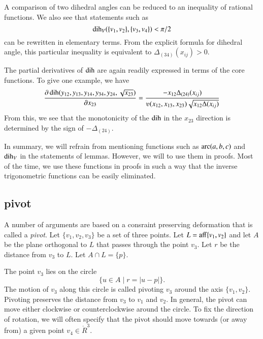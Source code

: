 A comparison of two dihedral angles can be reduced to an inequality
of rational functions. We also see that statements such as
  $$
  \operatorname{dih}_V(\{v_1,v_2\},\{v_3,v_4\}) < \pi/2
  $$
can be rewritten in elementary terms.  From the explicit formula
for dihedral angle, this particular inequality
is equivalent to $\Delta_{(34)}(x_{ij}) > 0$.

The partial derivatives of $\operatorname{dih}$ are again readily expressed in
terms of the core functions.
To give one example, we have
  $$
  \frac{\partial\dih(y_{12},y_{13},y_{14},y_{34},y_{24},\sqrt{x_{23}})}
  {\partial x_{23}} = 
  \frac{ -x_{12} \Delta_{(24)}(x_{ij})} {\ups(x_{12},x_{13},x_{23})
   \sqrt{x_{12}\Delta(x_{ij})}}
  $$
From this, we see that the monotonicity of the $\operatorname{dih}$
in the $x_{23}$ direction is determined by the sign of
$-\Delta_{(24)}$.




In summary, we will refrain from mentioning functions such as
$\operatorname{arc}(a,b,c)$ and $\operatorname{dih}_V$ in the statements of lemmas.  However,
we will to use them in proofs.  Most of the time, we use
these functions in proofs in such a way that the inverse
trigonometric functions
can be easily eliminated.


\newpage


\subsection{pivot}

A number of arguments are based on a consraint preserving deformation
that is called a {\it pivot}.    Let $\{v_1,v_2,v_3\}$ be a set
of three points.  Let $L={\operatorname{aff}}\{v_1,v_2\}$ and let $A$ be
the plane orthogonal to $L$ that passes through the point $v_3$.
Let $r$ be the distance from $v_3$ to $L$.  Let $A\cap L = \{p\}$.

The point $v_3$ lies on the circle
   $$
   \{u \in A \mid r = |u - p|\}.
   $$
The motion of $v_3$ along this circle is called pivoting $v_3$
around the axis $\{v_1,v_2\}$.   Pivoting preserves the distance from
$v_3$ to $v_1$ and $v_2$.   In general, the pivot can move
either clockwise or counterclockwise around the circle.  To fix
the direction of rotation, we will often specify that the pivot
should move towards (or away from) a given point $v_4\in\ring{R}^3$.



